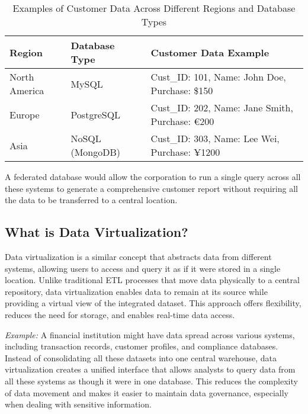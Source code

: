 \documentclass[12pt]{article}
\begin{document}
\begin{table}[h]
    \centering
    \begin{tabular}{|p{3cm}|p{3cm}|p{7cm}|}
        \hline
        \textbf{Region} & \textbf{Database Type} & \textbf{Customer Data Example} \\ \hline
        North America & MySQL & Cust\_ID: 101, Name: John Doe, Purchase: \$150 \\ \hline
        Europe & PostgreSQL & Cust\_ID: 202, Name: Jane Smith, Purchase: €200 \\ \hline
        Asia & NoSQL (MongoDB) & Cust\_ID: 303, Name: Lee Wei, Purchase: ¥1200 \\ \hline
    \end{tabular}
    \caption{Examples of Customer Data Across Different Regions and Database Types}
\end{table}

A federated database would allow the corporation to run a single query across all these systems to generate a comprehensive customer report without requiring all the data to be transferred to a central location.

\subsection{What is Data Virtualization?}
Data virtualization is a similar concept that abstracts data from different systems, allowing users to access and query it as if it were stored in a single location. Unlike traditional ETL processes that move data physically to a central repository, data virtualization enables data to remain at its source while providing a virtual view of the integrated dataset. This approach offers flexibility, reduces the need for storage, and enables real-time data access.

\textit{Example:} A financial institution might have data spread across various systems, including transaction records, customer profiles, and compliance databases. Instead of consolidating all these datasets into one central warehouse, data virtualization creates a unified interface that allows analysts to query data from all these systems as though it were in one database. This reduces the complexity of data movement and makes it easier to maintain data governance, especially when dealing with sensitive information.
\end{document}
